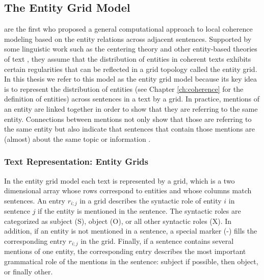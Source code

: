 \subsection{The Entity Grid Model}
\label{sec:rel-ent-grid} 

 are the first who proposed a general  computational approach to local coherence modeling based on the entity relations across adjacent sentences.  
Supported by some linguistic work such as the centering theory \cite{grosz95} and other entity-based theories of text \cite{prince81a}, they assume that the distribution of entities in coherent texts exhibits certain regularities that can be reflected in a grid topology called the entity grid. 
In this thesis we refer to this model as the entity grid model because its key idea is to represent the distribution of entities (see Chapter \ref{ch:coherence} for the definition of entities) across sentences in a text by a grid.   
In practice, mentions of an entity are linked together in order to show that they are referring to the same entity. 
Connections between mentions not only show that those are referring to the same entity but also indicate that sentences that contain those mentions are (almost) about the same topic or information \cite{barzilay08}. 

\subsubsection{Text Representation: Entity Grids}

In the entity grid model each text is represented by a grid, which is a two dimensional array whose rows correspond to entities and whose columns match sentences.
An entry $r_{i;j}$ in a grid describes the syntactic role of entity $i$ in sentence $j$ if the entity is mentioned in the sentence. 
The syntactic roles are categorized as subject (S), object (O), or all other syntactic roles (X). 
In addition, if an entity is not mentioned in a sentence, a special marker (-) fills the corresponding entry $r_{i;j}$ in the grid. 
Finally, if a sentence contains several mentions of one entity, the corresponding entry describes the most important grammatical role of the mentions in the sentence: subject if possible, then object, or finally other. 

